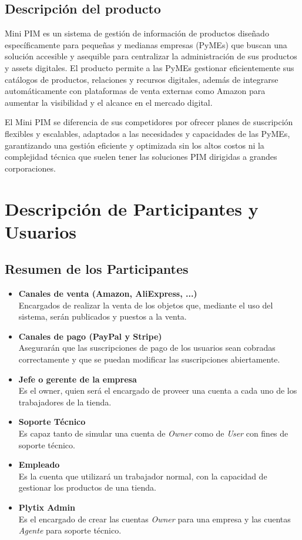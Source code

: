 \documentclass[12pt.a4paper]{article}
\begin{document}
\subsection{Descripción del producto}

Mini PIM es un sistema de gestión de información de productos diseñado específicamente para pequeñas y medianas empresas (PyMEs) que buscan una solución accesible y asequible para centralizar la administración de sus productos y assets digitales. El producto permite a las PyMEs gestionar eficientemente sus catálogos de productos, relaciones y recursos digitales, además de integrarse automáticamente con plataformas de venta externas como Amazon para aumentar la visibilidad y el alcance en el mercado digital.

El Mini PIM se diferencia de sus competidores por ofrecer planes de suscripción flexibles y escalables, adaptados a las necesidades y capacidades de las PyMEs, garantizando una gestión eficiente y optimizada sin los altos costos ni la complejidad técnica que suelen tener las soluciones PIM dirigidas a grandes corporaciones.


\section{Descripción de Participantes y Usuarios}

\subsection{Resumen de los Participantes}

\begin{itemize}

    \item \textbf{Canales de venta (Amazon, AliExpress, ...)} \\
        Encargados de realizar la venta de los objetos que, mediante el uso del sistema, serán publicados y puestos a la venta.
    \item \textbf{Canales de pago (PayPal y Stripe)} \\
        Asegurarán que las suscripciones de pago de los usuarios sean cobradas correctamente y que se puedan modificar las suscripciones abiertamente.
    \item \textbf{Jefe o gerente de la empresa} \\
        Es el owner, quien será el encargado de proveer una cuenta a cada uno de los trabajadores de la tienda.
    \item \textbf{Soporte Técnico} \\
        Es capaz tanto de simular una cuenta de \textit{Owner} como de \textit{User} con fines de soporte técnico.
    \item \textbf{Empleado} \\
        Es la cuenta que utilizará un trabajador normal, con la capacidad de gestionar los productos de una tienda.
    \item \textbf{Plytix Admin} \\
        Es el encargado de crear las cuentas \textit{Owner} para una empresa y las cuentas \textit{Agente} para soporte técnico.
\end{itemize}
\end{document}
